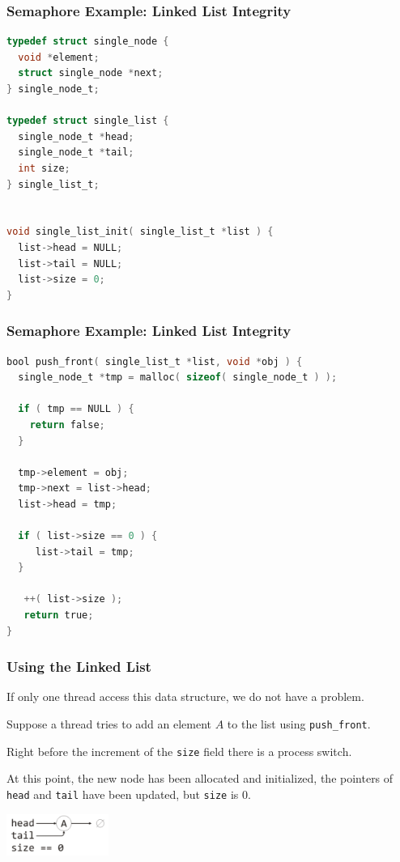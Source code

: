 \begin{frame}[fragile]
	\frametitle{Semaphore Example: Linked List Integrity}

	\begin{lstlisting}[language=C]
typedef struct single_node {
  void *element;
  struct single_node *next;
} single_node_t;

typedef struct single_list {
  single_node_t *head;
  single_node_t *tail;
  int size;
} single_list_t;


void single_list_init( single_list_t *list ) {
  list->head = NULL;
  list->tail = NULL;
  list->size = 0;
}
\end{lstlisting}
\end{frame}

\begin{frame}[fragile]
	\frametitle{Semaphore Example: Linked List Integrity}

	\begin{lstlisting}[language=C]
bool push_front( single_list_t *list, void *obj ) {
  single_node_t *tmp = malloc( sizeof( single_node_t ) );
  
  if ( tmp == NULL ) {
    return false;
  }
  
  tmp->element = obj;
  tmp->next = list->head;
  list->head = tmp;

  if ( list->size == 0 ) {
     list->tail = tmp;
  }
  
   ++( list->size );
   return true;
}

\end{lstlisting}
\end{frame}


\begin{frame}
	\frametitle{Using the Linked List}

	If only one thread access this data structure, we do not have a problem.

	Suppose a thread tries to add an element $A$ to the list using \texttt{push\_front}.

	Right before the increment of the \texttt{size} field there is a process switch.

	At this point, the new node has been allocated and initialized, the pointers of \texttt{head} and \texttt{tail} have been updated, but \texttt{size} is 0.

	\begin{center}
		\includegraphics[width=0.25\textwidth]{images/linkedlist1.png}
	\end{center}

\end{frame}

